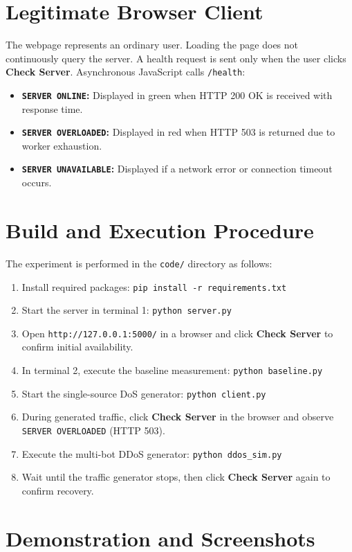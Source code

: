 \documentclass[11pt,a4paper]{article}
\begin{document}
\section{Legitimate Browser Client}
The webpage represents an ordinary user. Loading the page does not continuously query the server. A health request is sent only when the user clicks \textbf{Check Server}. Asynchronous JavaScript calls \texttt{/health}:
\begin{itemize}[leftmargin=*]
    \item \textbf{\texttt{SERVER ONLINE}:} Displayed in green when HTTP 200 OK is received with response time.
    \item \textbf{\texttt{SERVER OVERLOADED}:} Displayed in red when HTTP 503 is returned due to worker exhaustion.
    \item \textbf{\texttt{SERVER UNAVAILABLE}:} Displayed if a network error or connection timeout occurs.
\end{itemize}

\section{Build and Execution Procedure}
The experiment is performed in the \texttt{code/} directory as follows:
\begin{enumerate}[leftmargin=*]
    \item Install required packages: \texttt{pip install -r requirements.txt}
    \item Start the server in terminal 1: \texttt{python server.py}
    \item Open \texttt{http://127.0.0.1:5000/} in a browser and click \textbf{Check Server} to confirm initial availability.
    \item In terminal 2, execute the baseline measurement: \texttt{python baseline.py}
    \item Start the single-source DoS generator: \texttt{python client.py}
    \item During generated traffic, click \textbf{Check Server} in the browser and observe \texttt{SERVER OVERLOADED} (HTTP 503).
    \item Execute the multi-bot DDoS generator: \texttt{python ddos\_sim.py}
    \item Wait until the traffic generator stops, then click \textbf{Check Server} again to confirm recovery.
\end{enumerate}

\newpage
\section{Demonstration and Screenshots}
\end{document}
